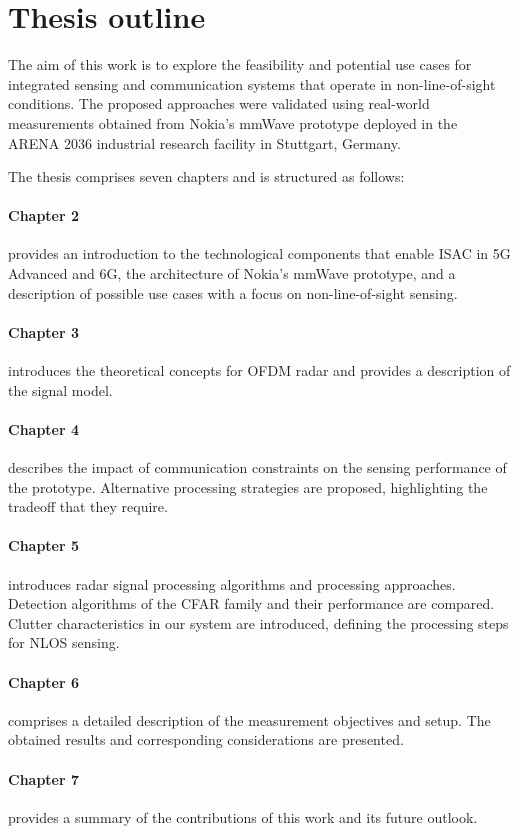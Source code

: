 \section{Thesis outline}

The aim of this work is to explore the feasibility and potential use cases for integrated sensing and communication systems that operate in non-line-of-sight conditions.
The proposed approaches were validated using real-world measurements obtained from Nokia's mmWave prototype deployed in the ARENA 2036 industrial research facility in Stuttgart, Germany.

The thesis comprises seven chapters and is structured as follows:

\paragraph{Chapter 2} provides an introduction to the technological components that enable ISAC in 5G Advanced and 6G, the architecture of Nokia's mmWave prototype, and a description of possible use cases with a focus on non-line-of-sight sensing.

\paragraph{Chapter 3} introduces the theoretical concepts for OFDM radar and provides a description of the signal model.

\paragraph{Chapter 4} describes the impact of communication constraints on the sensing performance of the prototype. Alternative processing strategies are proposed, highlighting the tradeoff that they require.

\paragraph{Chapter 5} introduces radar signal processing algorithms and processing approaches. Detection algorithms of the CFAR family and their performance are compared. Clutter characteristics in our system are introduced, defining the processing steps for NLOS sensing.

\paragraph{Chapter 6} comprises a detailed description of the measurement objectives and setup. The obtained results and corresponding considerations are presented.

\paragraph{Chapter 7} provides a summary of the contributions of this work and its future outlook.
